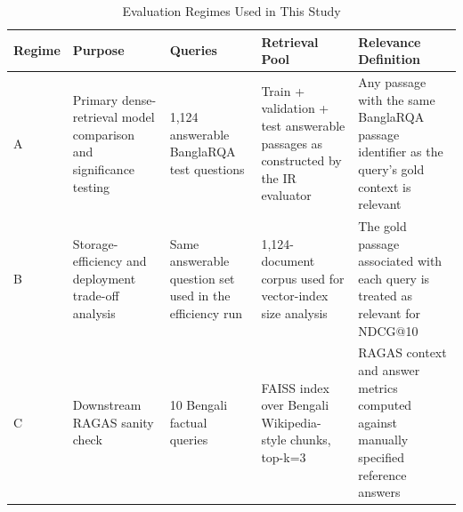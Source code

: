 \documentclass[manuscript,screen,review]{acmart}
\begin{document}
\begin{table}[t]
    \centering
    \caption{Evaluation Regimes Used in This Study}
    \label{tab:evaluation_regimes}
    \small
    \begin{tabularx}{\textwidth}{L{1.7cm}L{2.6cm}L{2.2cm}L{2.4cm}Y}
        \toprule
        \textbf{Regime} & \textbf{Purpose} & \textbf{Queries} & \textbf{Retrieval Pool} & \textbf{Relevance Definition} \\
        \midrule
        A & Primary dense-retrieval model comparison and significance testing & 1,124 answerable BanglaRQA test questions & Train + validation + test answerable passages as constructed by the IR evaluator & Any passage with the same BanglaRQA passage identifier as the query's gold context is relevant \\
        B & Storage-efficiency and deployment trade-off analysis & Same answerable question set used in the efficiency run & 1,124-document corpus used for vector-index size analysis & The gold passage associated with each query is treated as relevant for NDCG@10 \\
        C & Downstream RAGAS sanity check & 10 Bengali factual queries & FAISS index over Bengali Wikipedia-style chunks, top-k=3 & RAGAS context and answer metrics computed against manually specified reference answers \\
        \bottomrule
    \end{tabularx}
\end{table}
\end{document}
